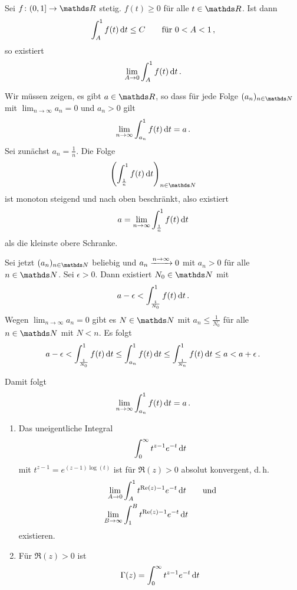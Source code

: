 \begin{lemm}\label{lemma:majoranten-int}
Sei $f\colon (0,1] \ra \RR$ stetig. $f(t) \geq 0$ für alle $t \in\RR$.
Ist dann
\[
	\int_A^1 f(t) \,\mathrm{d} t
	\leq C
	\qquad \text{für } 0 < A < 1
	\,,
\]
so existiert
\[
	\lim_{A\to 0} \int_A^1 f(t) \,\mathrm{d} t
	\,.
\]
\end{lemm}
\begin{bewe}
Wir müssen zeigen, es gibt $a \in \RR$, so dass für jede Folge $(a_n)_{n\in\NN}$ mit $\lim_{n\to\infty} a_n = 0$ und $a_n > 0$ gilt
\[
	\lim_{n\to\infty} \int_{a_n}^1 f(t) \,\mathrm{d} t
	= a
	\,.
\]
Sei zunächst $a_n = \frac{1}{n}$. Die Folge
\[
	\left(\int_{\frac{1}{n}}^1 f(t) \opd t\right)_{n\in\NN}
\]
ist monoton steigend und nach oben beschränkt, also existiert
\[
	a = \lim_{n\to\infty} \int_{\frac{1}{n}}^1 f(t) \,\mathrm{d} t
\]
als die kleinste obere Schranke.

Sei jetzt $(a_n)_{n\in\NN}$ beliebig und $a_n \xrightarrow{n\to\infty} 0$ mit $a_n > 0$ für alle $n\in\NN$.
Sei $\epsilon > 0$.
Dann existiert $N_0 \in \NN$ mit
\[
	a - \epsilon
	< \int_{\frac{1}{N_0}}^1 f(t) \,\mathrm{d} t
	\,.
\]
Wegen $\lim_{n\to\infty} a_n = 0$ gibt es $N\in\NN$ mit $a_n \leq \frac{1}{N_0}$ für alle $n\in\NN$ mit $N < n$.
Es folgt
\[
	a - \epsilon
	< \int_{\frac{1}{N_0}}^1 f(t)\,\mathrm{d} t
	\leq \int_{a_n}^1 f(t)\,\mathrm{d} t
	\leq \int^1_{\frac{1}{N_n}} f(t)\,\mathrm{d} t
	\leq a
	< a+\epsilon
	\,.
\]

Damit folgt
\[
	\lim_{n\to\infty} \int_{a_n}^1 f(t) \,\mathrm{d} t
	= a
	\,.
\]
\end{bewe}

\begin{satz}
\begin{enumerate}
\item Das uneigentliche Integral
\[
	\int_0^\infty t^{z-1}e^{-t} \,\mathrm{d} t
\]
mit $t^{z-1} = e^{(z-1)\log(t)}$ ist für $\Re(z) > 0$ absolut konvergent, d.\,h.
\begin{align*}
	\lim_{A\to 0} &\int_A^1 t^{\mathrm{Re}(z)-1}e^{-t} \,\mathrm{d} t
	\qquad \text{und} \\
	\lim_{B\to\infty} &\int_1^B t^{\mathrm{Re}(z)-1}e^{-t} \,\mathrm{d} t
\end{align*}
existieren.

\item Für $\Re(z) > 0$ ist
\[
	\Gamma(z) = \int_0^\infty t^{z-1}e^{-t} \,\mathrm{d} t
\]
\end{enumerate}
\end{satz}

